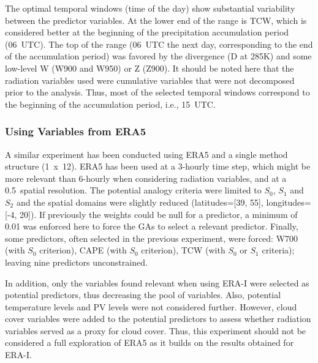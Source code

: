 \documentclass[draft]{agujournal2019}
\begin{document}
The optimal temporal windows (time of the day) show substantial variability between the predictor variables. At the lower end of the range is TCW, which is considered better at the beginning of the precipitation accumulation period (06~UTC). The top of the range (06~UTC the next day, corresponding to the end of the accumulation period) was favored by the divergence (D at 285\degree K) and some low-level W (W900 and W950) or Z (Z900). It should be noted here that the radiation variables used were cumulative variables that were not decomposed prior to the analysis. Thus, most of the selected temporal windows correspond to the beginning of the accumulation period, i.e., 15~UTC.


\subsubsection{Using Variables from ERA5}

A similar experiment has been conducted using ERA5 and a single method structure (1~x~12). ERA5 has been used at a 3-hourly time step, which might be more relevant than 6-hourly when considering radiation variables, and at a 0.5\degree\ spatial resolution. The potential analogy criteria were limited to $S_{0}$, $S_{1}$ and $S_{2}$ and the spatial domains were slightly reduced (latitudes=[39, 55], longitudes=[-4, 20]). If previously the weights could be null for a predictor, a minimum of 0.01 was enforced here to force the GAs to select a relevant predictor. Finally, some predictors, often selected in the previous experiment, were forced: W700 (with $S_{0}$ criterion), CAPE (with $S_{0}$ criterion), TCW (with $S_{0}$ or $S_{1}$ criteria); leaving nine predictors unconstrained.

In addition, only the variables found relevant when using ERA-I were selected as potential predictors, thus decreasing the pool of variables. Also, potential temperature levels and PV levels were not considered further. However, cloud cover variables were added to the potential predictors to assess whether radiation variables served as a proxy for cloud cover. Thus, this experiment should not be considered a full exploration of ERA5 as it builds on the results obtained for ERA-I.
\end{document}
